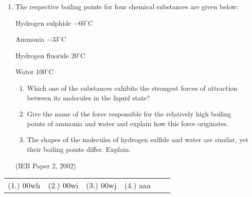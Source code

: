 \begin{eocexercises}{}
\begin{enumerate}
\item{The respective boiling points for four chemical substances are given below:

Hydrogen sulphide $-60^{\circ}$C

Ammonia $-33^{\circ}$C

Hydrogen fluoride $20^{\circ}$C

Water $100^{\circ}$C

\begin{enumerate}
\item{Which one of the substances exhibits the strongest forces of attraction between its molecules in the liquid state?}
\item{Give the name of the force responsible for the relatively high boiling points of ammonia and water and explain how this force originates.}
\item{The shapes of the molecules of hydrogen sulfide and water are similar, yet their boiling points differ. Explain.}
\end{enumerate}

}
(IEB Paper 2, 2002)
\end{enumerate}

\practiceinfo

\begin{tabular}[h]{cccccc}
(1.) 00wh & (2.) 00wi & (3.) 00wj & (4.) aaa
 \end{tabular}
\end{eocexercises}






